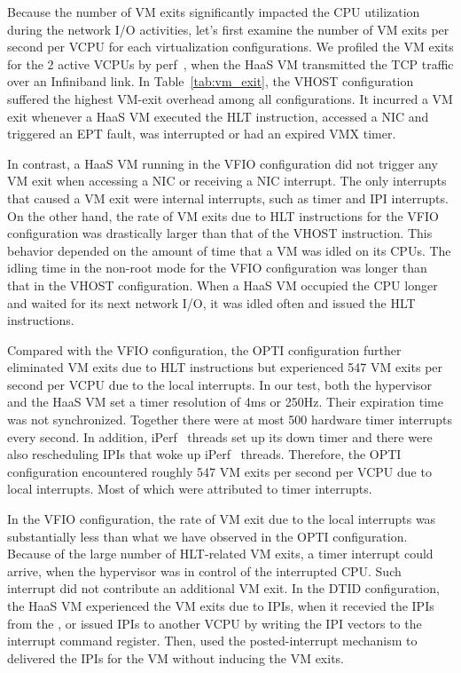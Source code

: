 Because the number of VM exits significantly impacted the CPU
utilization during the network I/O activities, let's first
examine the number of VM exits per second per VCPU for each
virtualization configurations. We profiled the VM exits for
the 2 active VCPUs by perf~\cite{perf}, when the HaaS VM
transmitted the TCP traffic over an Infiniband link. In
Table~\ref{tab:vm_exit}, the VHOST configuration suffered the
highest VM-exit overhead among all configurations. It incurred
a VM exit whenever a HaaS VM executed the HLT instruction,
accessed a NIC and triggered an EPT fault, was interrupted or
had an expired VMX timer.

In contrast, a HaaS VM running in the VFIO configuration did
not trigger any VM exit when accessing a NIC or receiving a
NIC interrupt. The only interrupts that caused a VM exit were
internal interrupts, such as timer and IPI interrupts. On the
other hand, the rate of VM exits due to HLT instructions for
the VFIO configuration was drastically larger than that of the
VHOST instruction. This behavior depended on the amount of
time that a VM was idled on its CPUs. The idling time in the
non-root mode for the VFIO configuration was longer than that
in the VHOST configuration. When a HaaS VM occupied the CPU
longer and waited for its next network I/O, it was idled often
and issued the HLT instructions.

Compared with the VFIO configuration, the OPTI configuration
further eliminated VM exits due to HLT instructions but
experienced 547 VM exits per second per VCPU due to the local
interrupts. In our test, both the hypervisor and the HaaS VM
set a timer resolution of 4ms or 250Hz. Their expiration time
was not synchronized. Together there were at most 500 hardware
timer interrupts every second. In addition, iPerf~\cite{iperf}
threads set up its down timer and there were also rescheduling
IPIs that woke up iPerf~\cite{iperf} threads. Therefore, the
OPTI configuration encountered roughly 547 VM exits per second
per VCPU due to local interrupts. Most of which were
attributed to timer interrupts.

In the VFIO configuration, the rate of VM exit due to the
local interrupts was substantially less than what we have
observed in the OPTI configuration. Because of the large
number of HLT-related VM exits, a timer interrupt could
arrive, when the hypervisor was in control of the interrupted
CPU. Such interrupt did not contribute an additional VM exit.
In the DTID configuration, the HaaS VM experienced the VM
exits due to IPIs, when it recevied the IPIs from the \na, or
issued IPIs to another VCPU by writing the IPI vectors to the
interrupt command register. Then, \na used the
posted-interrupt mechanism to delivered the IPIs for the VM
without inducing the VM exits.

